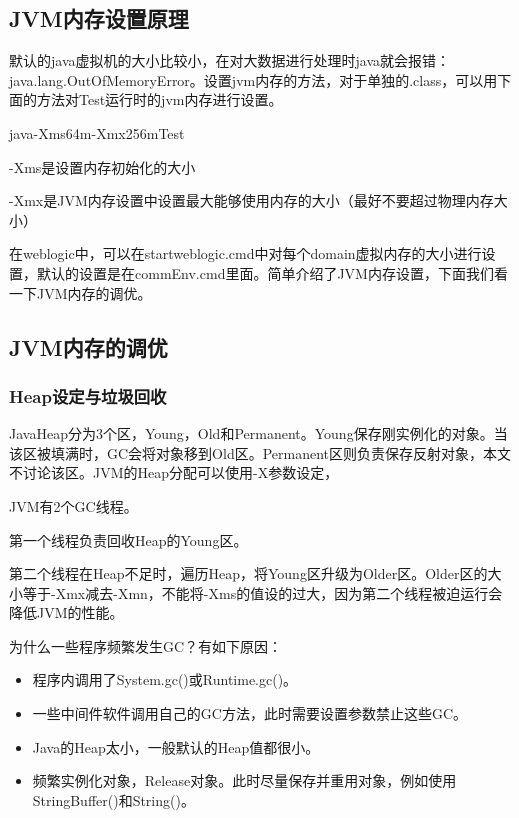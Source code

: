 \documentclass[10pt,b5paper]{article}
\begin{document}
\subsection{JVM内存设置原理}
\label{sec-6-1}

默认的java虚拟机的大小比较小，在对大数据进行处理时java就会报错：java.lang.OutOfMemoryError。设置jvm内存的方法，对于单独的.class，可以用下面的方法对Test运行时的jvm内存进行设置。

java-Xms64m-Xmx256mTest

-Xms是设置内存初始化的大小

-Xmx是JVM内存设置中设置最大能够使用内存的大小（最好不要超过物理内存大小）

在weblogic中，可以在startweblogic.cmd中对每个domain虚拟内存的大小进行设置，默认的设置是在commEnv.cmd里面。简单介绍了JVM内存设置，下面我们看一下JVM内存的调优。
\subsection{JVM内存的调优}
\label{sec-6-2}

\subsubsection{Heap设定与垃圾回收}
\label{sec-6-2-1}

JavaHeap分为3个区，Young，Old和Permanent。Young保存刚实例化的对象。当该区被填满时，GC会将对象移到Old区。Permanent区则负责保存反射对象，本文不讨论该区。JVM的Heap分配可以使用-X参数设定，

JVM有2个GC线程。

第一个线程负责回收Heap的Young区。

第二个线程在Heap不足时，遍历Heap，将Young区升级为Older区。Older区的大小等于-Xmx减去-Xmn，不能将-Xms的值设的过大，因为第二个线程被迫运行会降低JVM的性能。

为什么一些程序频繁发生GC？有如下原因：

\begin{itemize}
\item 程序内调用了System.gc()或Runtime.gc()。

\item 一些中间件软件调用自己的GC方法，此时需要设置参数禁止这些GC。

\item Java的Heap太小，一般默认的Heap值都很小。

\item 频繁实例化对象，Release对象。此时尽量保存并重用对象，例如使用StringBuffer()和String()。
\end{itemize}
\end{document}
